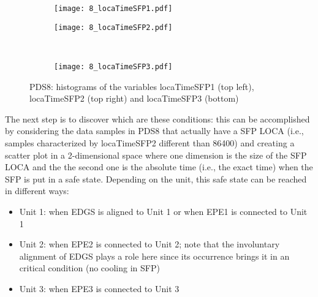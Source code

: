 \begin{figure}
  \begin{subfigure}{.5\linewidth}
    \centering
    \texttt{[image: 8\_locaTimeSFP1.pdf]}
  \end{subfigure}%
  \begin{subfigure}{.5\linewidth}
    \centering
    \texttt{[image: 8\_locaTimeSFP2.pdf]}
  \end{subfigure}\\[1ex]
  \begin{subfigure}{\linewidth}
    \centering
    \texttt{[image: 8\_locaTimeSFP3.pdf]}
  \end{subfigure}
  \caption{PDS8: histograms of the variables locaTimeSFP1 (top left), locaTimeSFP2 (top right) and locaTimeSFP3 (bottom)}
  \label{fig:histPDS8_8_locaTimeSFP}
\end{figure}

The next step is to discover which are these conditions: this can be accomplished by considering the data samples
in PDS8 that actually have a SFP LOCA (i.e., samples characterized by locaTimeSFP2 different than 86400) 
and creating a scatter plot
in a 2-dimensional space where one dimension is the size of the SFP LOCA and the the second one is
the absolute time (i.e., the exact time) when the SFP is put in a safe state. 
Depending on the unit, this safe state can be reached in different ways:
\begin{itemize}
  \item Unit 1: when EDGS is aligned to Unit 1 or when EPE1 is connected to Unit 1
  \item Unit 2: when EPE2 is connected to Unit 2; note that the involuntary alignment of EDGS plays a role here since
                its occurrence brings it in an critical condition (no cooling in SFP)
  \item Unit 3: when EPE3 is connected to Unit 3
\end{itemize}

